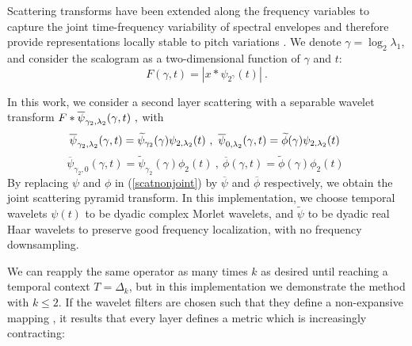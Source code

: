 %
%
%
%
Scattering transforms have been extended along the frequency
variables to capture the joint time-frequency 
variability of spectral envelopes and therefore provide 
 representations locally stable to pitch variations \cite{deepscatt}. 
We denote $\gamma = \log_2 \lambda_1$, and consider
the scalogram as a two-dimensional function of $\gamma$ and $t$: 
\[
F (\gamma, t) = |x \ast \psi_{2^{\gamma}} (t)|~.
\]

In this work, we consider a second layer scattering with 
a separable wavelet transform $F \ast \overline{\psi}_{\gamma_2, {\lambda}_2} (\gamma, t)~,$
with
$$\overline{\psi}_{{\gamma_2}, {{\lambda}_2}}(\gamma,t) = \widetilde{\psi}_{\gamma_2}(\gamma) \psi_{2,{\lambda}_2}(t)~,~\overline{\psi}_{{0}, {{\lambda}_2}}(\gamma,t) = \widetilde{\phi}(\gamma) \psi_{2,{\lambda}_2}(t)~$$
$$\overline{\psi}_{{\gamma_2}, {0}}(\gamma,t) = \widetilde{\psi}_{\gamma_2}(\gamma) \phi_{2}(t)~,~\overline{\phi}(\gamma,t) = \widetilde{\phi}(\gamma) \phi_{2}(t)~$$
By replacing $\psi$ and $\phi$ in (\ref{scatnonjoint}) by $\overline{\psi}$ and $\overline{\phi}$ respectively, we obtain the joint scattering pyramid transform.
In this implementation, 
we choose temporal wavelets $\psi(t)$ to be dyadic complex Morlet wavelets,
and $\widetilde{\psi}$ to be dyadic real Haar wavelets to preserve good frequency localization,
with no frequency downsampling. 

We can reapply the same operator as many times $k$ as desired until reaching a temporal 
context $T = \Delta_k$, but in this implementation we demonstrate the method with $k\leq 2$.
If the wavelet filters are chosen such that they define a non-expansive mapping \cite{pami}, it results that every layer defines a metric which is increasingly contracting:


